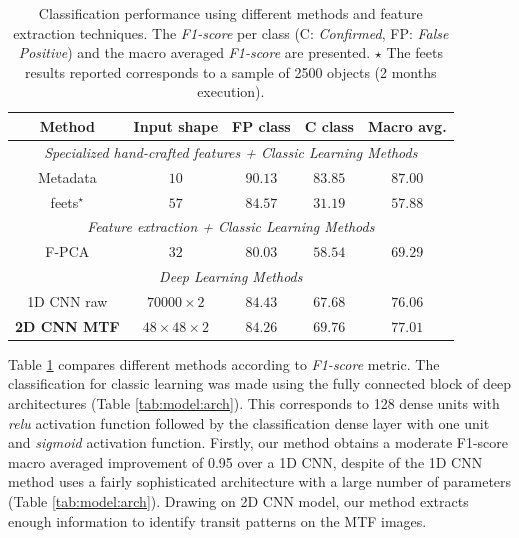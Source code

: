\begin{table}[!t]
\caption{Classification performance using different methods and feature extraction techniques. The \textit{F1-score} per class (C: \textit{Confirmed}, FP: \textit{False Positive}) and the macro averaged \textit{F1-score} are presented. $\star$ The feets results reported corresponds to a sample of 2500 objects (2 months execution).}
\label{tab:class_results}
\begin{tabular}{c|c|cc|c} \hline
\textbf{Method} & \textbf{Input shape} & \textbf{FP class}& \textbf{C class} & \textbf{Macro avg.} \\ \hline 
\multicolumn{5}{c}{\textit{Specialized hand-crafted features + Classic Learning Methods}} \\ \hline
Metadata  & $10$                 & $90.13$ & $83.85$  & $87.00$ \\ %
feets$^{\star}$     & $57$                 & $84.57$ & $31.19$  & $57.88$    \\ \hline
\multicolumn{5}{c}{\textit{Feature extraction + Classic Learning Methods}} \\ \hline
F-PCA  & $32$                 & $80.03$ & $58.54$  & $69.29$ \\ \hline
\multicolumn{5}{c}{\textit{Deep Learning Methods}} \\ \hline
1D CNN raw  & $70000\times 2$         & $84.43$ & $67.68$ & $76.06$  \\ 
\textbf{2D CNN MTF} 
            & $48\times48\times 2$    & $84.26$   & $69.76$  & $77.01$   \\ 
\hline
\end{tabular}
\end{table}
Table \ref{tab:class_results} compares different methods according to \textit{F1-score} metric.  %
The classification for classic learning was made using the fully connected block of deep architectures (Table \ref{tab:model:arch}). This corresponds to 128 dense units with \textit{relu} activation function followed by the classification dense layer with one unit and \textit{sigmoid} activation function. 
Firstly, our method obtains a moderate F1-score macro averaged improvement of 0.95 over a 1D CNN, despite of the 1D CNN method uses a fairly sophisticated architecture with a large number of parameters (Table \ref{tab:model:arch}).
Drawing on 2D CNN model, our method extracts enough information to identify transit patterns on the MTF images.

